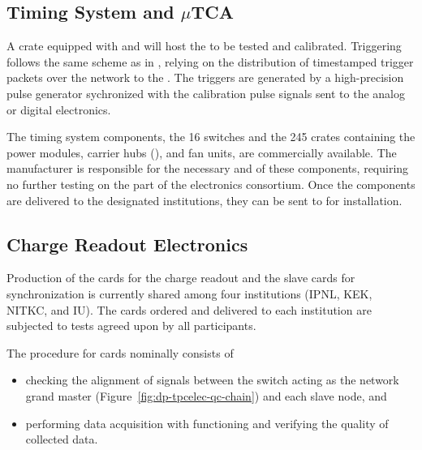\subsection{Timing System and $\mu$TCA}
\label{ssec:dp-tpcelec-prod-utca}

A  crate equipped with  and  will host the  to be tested and calibrated. Triggering follows the same scheme as in , relying on the distribution of timestamped trigger packets over the  network to the . The triggers are generated by a high-precision pulse generator %
sychronized with the calibration pulse signals sent to the analog or digital electronics. 

The timing system components,  the  \num{16}  switches and the \num{245}  crates containing the power modules, carrier hubs (), and fan units, are commercially available. The manufacturer is responsible for the necessary  and   of these components, requiring no further testing on the part of the \dual electronics consortium. Once the components are delivered to the designated institutions, they can be sent to  for installation. 



\subsection{Charge Readout Electronics}
\label{ssec:dp-tpcelec-prod-cro}

Production of the  cards for the charge readout and the  slave cards for synchronization is currently shared among four institutions (IPNL, KEK, NITKC, and IU). 
 The cards ordered and delivered to each institution are subjected to   tests agreed upon by all participants. 

The  procedure for  cards nominally consists of 
\begin{itemize}
\item{checking the alignment of  signals between the  switch acting as the network grand master (Figure~\ref{fig:dp-tpcelec-qc-chain}) and each  slave node, and }
\item{performing data acquisition with functioning  and verifying the quality of collected data.}
\end{itemize}

